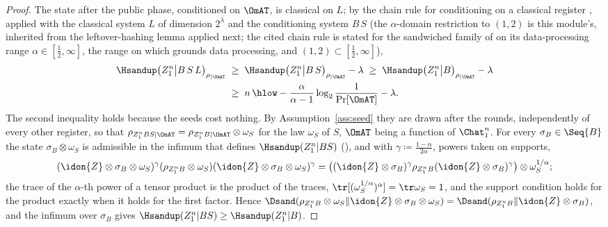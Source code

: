 \begin{proof}
The state after the public phase, conditioned on $\OmAT$, is classical on
$L$; by the chain rule for conditioning on a classical register
\cite[Lemmas~5.3--5.4, Eq.~(5.94)]{tomamichel2016finite}, applied with
the classical system $L$ of dimension $2^{\lambda}$ and the conditioning
system $B\,S$ (the $\alpha$-domain
restriction to $(1,2)$ is this module's, inherited from the
leftover-hashing lemma applied next; the cited chain rule is stated for the
sandwiched family of \cite[Def.~5.2, Eqs.~(5.18)--(5.19)]%
{tomamichel2016finite} on its data-processing range
$\alpha\in[\frac12,\infty]$, the range on which
\cite[Thm.~4.1, Eq.~(4.82)]{tomamichel2016finite} grounds data
processing, and $(1,2)\subset[\frac12,\infty]$),
\begin{equation}\label{eq:chainrule}
\begin{aligned}
  \Hsandup\big(Z_1^n\big|B\,S\,L\big)_{\rho_{|\OmAT}}
  &\;\ge\;\Hsandup\big(Z_1^n\big|B\,S\big)_{\rho_{|\OmAT}}-\lambda
  \;\ge\;\Hsandup\big(Z_1^n\big|B\big)_{\rho_{|\OmAT}}-\lambda\\
  &\;\ge\;n\,\hlow-\frac{\alpha}{\alpha-1}\log_2\frac{1}{\Pr[\OmAT]}
  -\lambda .
\end{aligned}
\end{equation}
The second inequality holds because the seeds cost nothing. By
Assumption~\ref{ass:seed} they are drawn after the rounds, independently of
every other register, so that
$\rho_{Z_1^nBS|\OmAT}=\rho_{Z_1^nB|\OmAT}\otimes\omega_S$ for the law
$\omega_S$ of $S$, $\OmAT$ being a function of $\Chat_1^n$. For every
$\sigma_B\in\Seq{B}$ the state $\sigma_B\otimes\omega_S$ is admissible in the
infimum that defines $\Hsandup(Z_1^n|BS)$ (), and
with $\gamma\coloneqq\frac{1-\alpha}{2\alpha}$, powers taken on supports,
\[
  (\idon{Z}\otimes\sigma_B\otimes\omega_S)^{\gamma}
  (\rho_{Z_1^nB}\otimes\omega_S)
  (\idon{Z}\otimes\sigma_B\otimes\omega_S)^{\gamma}
  =\big((\idon{Z}\otimes\sigma_B)^{\gamma}\rho_{Z_1^nB}
  (\idon{Z}\otimes\sigma_B)^{\gamma}\big)\otimes\omega_S^{1/\alpha};
\]
the trace of the $\alpha$-th power of a tensor product is the product of the
traces, $\tr[(\omega_S^{1/\alpha})^{\alpha}]=\tr\omega_S=1$, and the support
condition holds for the product exactly when it holds for the first factor.
Hence
$\Dsand(\rho_{Z_1^nB}\otimes\omega_S\|\idon{Z}\otimes\sigma_B\otimes\omega_S)
=\Dsand(\rho_{Z_1^nB}\|\idon{Z}\otimes\sigma_B)$, and the infimum over
$\sigma_B$ gives $\Hsandup(Z_1^n|BS)\ge\Hsandup(Z_1^n|B)$.


\end{proof}
